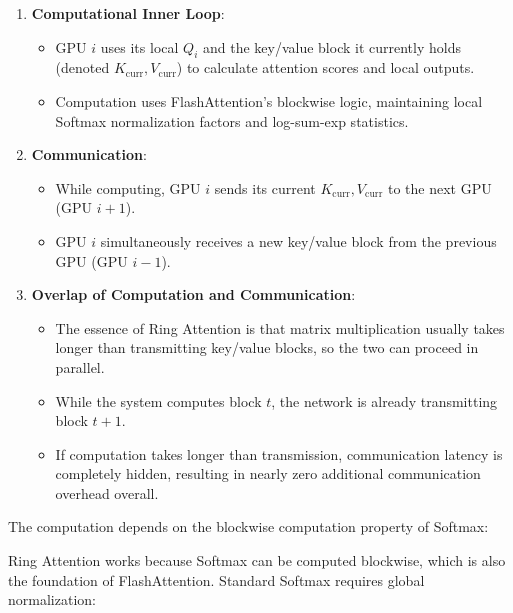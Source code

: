 \begin{enumerate}
\def\labelenumi{\arabic{enumi}.}
\tightlist
\item
{}
  \textbf{Computational Inner Loop}:

  \begin{itemize}
  \tightlist
  \item
    GPU \(i\) uses its local \(Q_i\) and the key/value block it currently holds (denoted \(K_{\mathrm{curr}}, V_{\mathrm{curr}}\)) to calculate attention scores and local outputs.
  \item
    Computation uses FlashAttention's blockwise logic, maintaining local Softmax normalization factors and log-sum-exp statistics.
  \end{itemize}
\item
{}
  \textbf{Communication}:

  \begin{itemize}
  \tightlist
  \item
    While computing, GPU \(i\) sends its current \(K_{\mathrm{curr}}, V_{\mathrm{curr}}\) to the next GPU (GPU \(i+1\)).
  \item
    GPU \(i\) simultaneously receives a new key/value block from the previous GPU (GPU \(i-1\)).
  \end{itemize}
\item
{}
  \textbf{Overlap of Computation and Communication}:

  \begin{itemize}
  \tightlist
  \item
    The essence of Ring Attention is that matrix multiplication usually takes longer than transmitting key/value blocks, so the two can proceed in parallel.
  \item
    While the system computes block \(t\), the network is already transmitting block \(t+1\).
  \item
    If computation takes longer than transmission, communication latency is completely hidden, resulting in nearly zero additional communication overhead overall.
  \end{itemize}
\end{enumerate}

The computation depends on the blockwise computation property of Softmax:

Ring Attention works because Softmax can be computed blockwise, which is also the foundation of FlashAttention. Standard Softmax requires global normalization:

